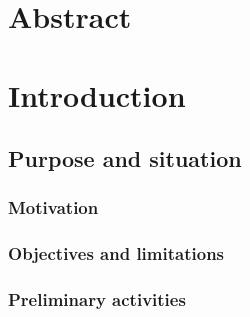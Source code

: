 \documentclass[
    a4paper,      %
    10pt,         %
    openright,    %
    notitlepage,  %
    parskip=half, %
]{scrreprt}       %
\theoremstyle{definition}                    %
\begin{document}

\chapter*{}
\label{chap:versions}

\begin{versionhistory}
\end{versionhistory}
\listoftodos{}

\chapter*{Abstract}
\label{chap:abstract}

\blindtext
\tableofcontents
\cleardoublepage{}


\chapter{Introduction}
\label{chap:introduction}

\blindtext{}
\blindtext{}

\section{Purpose and situation}
\label{sec:purpose}

\subsection{Motivation}
\label{subsec:motivation}

\blindtext{}

\subsection{Objectives and limitations}
\label{subsec:objectives}

\blindtext{}

\subsection{Preliminary activities}
\label{subsec:preliminary}
\end{document}
